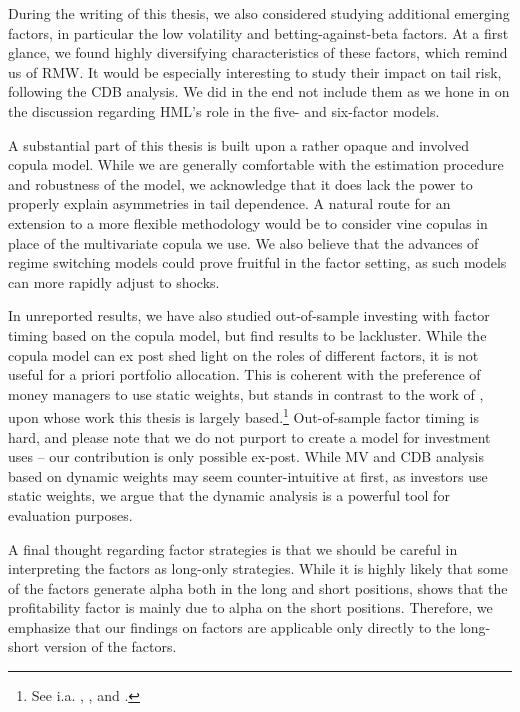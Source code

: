 During the writing of this thesis, we also considered studying additional emerging factors, in particular the low volatility and betting-against-beta factors. At a first glance, we found highly diversifying characteristics of these factors, which remind us of RMW. It would be especially interesting to study their impact on tail risk, following the CDB analysis. We did in the end not include them as we hone in on the discussion regarding HML's role in the five- and six-factor models.

A substantial part of this thesis is built upon a rather opaque and involved copula model. While we are generally comfortable with the estimation procedure and robustness of the model, we acknowledge that it does lack the power to properly explain asymmetries in tail dependence. A natural route for an extension to a more flexible methodology would be to consider vine copulas in place of the multivariate copula we use. We also believe that the advances of regime switching models could prove fruitful in the factor setting, as such models can more rapidly adjust to shocks.

In unreported results, we have also studied out-of-sample investing with factor timing based on the copula model, but find results to be lackluster. While the copula model can ex post shed light on the roles of different factors, it is not useful for a priori portfolio allocation. This is coherent with the preference of money managers to use static weights, but stands in contrast to the work of \textcite{ChristoffersenLanglois2013}, upon whose work this thesis is largely based.\footnote{See i.a. \textcite{AQRSiren}, \textcite{BlackRock}, \textcite{MSCI} and \textcite{Robeco}.} Out-of-sample factor timing is hard, and please note that we do not purport to create a model for investment uses -- our contribution is only possible ex-post. While MV and CDB analysis based on dynamic weights may seem counter-intuitive at first, as investors use static weights, we argue that the dynamic analysis is a powerful tool for evaluation purposes.

A final thought regarding factor strategies is that we should be careful in interpreting the factors as long-only strategies. While it is highly likely that some of the factors generate alpha both in the long and short positions, \textcite{Wang2013} shows that the profitability factor is mainly due to alpha on the short positions. Therefore, we emphasize that our findings on factors are applicable only directly to the long-short version of the factors.